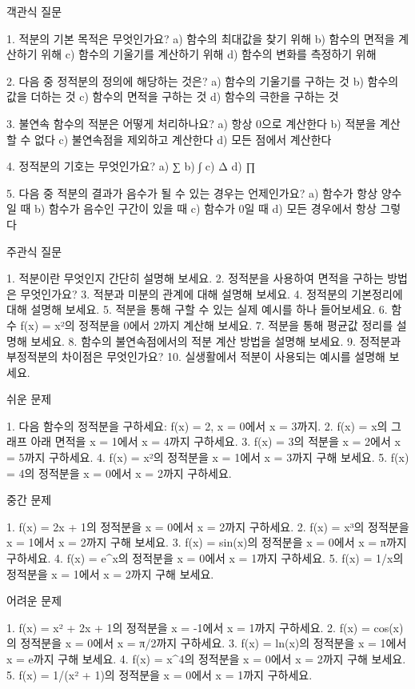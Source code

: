 \documentclass[fleqn]{article}
\begin{document}
      
         객관식 질문

1. 적분의 기본 목적은 무엇인가요?
   a) 함수의 최대값을 찾기 위해  
   b) 함수의 면적을 계산하기 위해  
   c) 함수의 기울기를 계산하기 위해  
   d) 함수의 변화를 측정하기 위해  

2. 다음 중 정적분의 정의에 해당하는 것은?
   a) 함수의 기울기를 구하는 것  
   b) 함수의 값을 더하는 것  
   c) 함수의 면적을 구하는 것  
   d) 함수의 극한을 구하는 것  

3. 불연속 함수의 적분은 어떻게 처리하나요?
   a) 항상 0으로 계산한다  
   b) 적분을 계산할 수 없다  
   c) 불연속점을 제외하고 계산한다  
   d) 모든 점에서 계산한다  

4. 정적분의 기호는 무엇인가요?
   a) ∑  
   b) ∫  
   c) Δ  
   d) ∏  

5. 다음 중 적분의 결과가 음수가 될 수 있는 경우는 언제인가요?
   a) 함수가 항상 양수일 때  
   b) 함수가 음수인 구간이 있을 때  
   c) 함수가 0일 때  
   d) 모든 경우에서 항상 그렇다  

 주관식 질문

1. 적분이란 무엇인지 간단히 설명해 보세요.
2. 정적분을 사용하여 면적을 구하는 방법은 무엇인가요?
3. 적분과 미분의 관계에 대해 설명해 보세요.
4. 정적분의 기본정리에 대해 설명해 보세요.
5. 적분을 통해 구할 수 있는 실제 예시를 하나 들어보세요.
6. 함수 f(x) = x²의 정적분을 0에서 2까지 계산해 보세요.
7. 적분을 통해 평균값 정리를 설명해 보세요.
8. 함수의 불연속점에서의 적분 계산 방법을 설명해 보세요.
9. 정적분과 부정적분의 차이점은 무엇인가요?
10. 실생활에서 적분이 사용되는 예시를 설명해 보세요.

 쉬운 문제

1. 다음 함수의 정적분을 구하세요: f(x) = 2, x = 0에서 x = 3까지.
2. f(x) = x의 그래프 아래 면적을 x = 1에서 x = 4까지 구하세요.
3. f(x) = 3의 적분을 x = 2에서 x = 5까지 구하세요.
4. f(x) = x²의 정적분을 x = 1에서 x = 3까지 구해 보세요.
5. f(x) = 4의 정적분을 x = 0에서 x = 2까지 구하세요.

 중간 문제

1. f(x) = 2x + 1의 정적분을 x = 0에서 x = 2까지 구하세요.
2. f(x) = x³의 정적분을 x = 1에서 x = 2까지 구해 보세요.
3. f(x) = sin(x)의 정적분을 x = 0에서 x = π까지 구하세요.
4. f(x) = e^x의 정적분을 x = 0에서 x = 1까지 구하세요.
5. f(x) = 1/x의 정적분을 x = 1에서 x = 2까지 구해 보세요.

 어려운 문제

1. f(x) = x² + 2x + 1의 정적분을 x = -1에서 x = 1까지 구하세요.
2. f(x) = cos(x)의 정적분을 x = 0에서 x = π/2까지 구하세요.
3. f(x) = ln(x)의 정적분을 x = 1에서 x = e까지 구해 보세요.
4. f(x) = x^4의 정적분을 x = 0에서 x = 2까지 구해 보세요.
5. f(x) = 1/(x² + 1)의 정적분을 x = 0에서 x = 1까지 구하세요.

      
        
\end{document}

